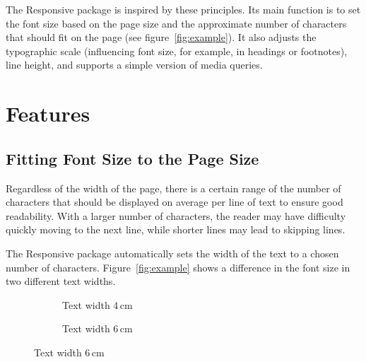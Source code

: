 \documentclass{ltxdoc}
\begin{document}
The Responsive package is inspired by these principles. Its main function
is to set the font size based on the page size and the approximate number of
characters that should fit on the page (see figure~\ref{fig:example}). It also adjusts the typographic scale
(influencing font size, for example, in headings or footnotes), line height,
and supports a simple version of media queries.


\section{Features}


\subsection{Fitting Font Size to the Page Size}

Regardless of the width of the page, there is a certain range of the number of
characters that should be displayed on average per line of text to ensure good
readability. With a larger number of characters, the reader may have difficulty
quickly moving to the next line, while shorter lines may lead to skipping
lines. 

The Responsive package automatically sets the width of the text to a chosen number of characters.
Figure~\ref{fig:example} shows a difference in the font size in two
different text widths.


\begin{figure}[htbp]
  \caption{Example of changing font size based on the width of the text block:}\label{fig:example}
\begin{subfigure}[t]{0.45\textwidth}
  \centering
\fbox{%
\begin{minipage}{4cm}
\ResponsiveSetup{}
\setsizes{}

\lipsum[1]

\end{minipage}}
\caption{Text width 4\,cm}
\end{subfigure}
\begin{subfigure}[t]{0.45\textwidth}
  \centering
{}
\caption{Text width 6\,cm}
\end{subfigure}
\end{figure}
\end{document}
